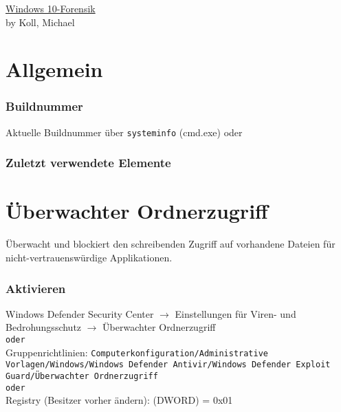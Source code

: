 \raggedright
\footnotesize
\begin{multicols}{3}	
	\setlength{\premulticols}{1pt}
	\setlength{\postmulticols}{1pt}
	\setlength{\multicolsep}{1pt}
	\setlength{\columnsep}{2pt}

\begin{center}
     \Large{\underline{Windows 10-Forensik}} \\
     \small by Koll, Michael \\
\end{center}

\section{Allgemein}

\subsubsection{Buildnummer}
Aktuelle Buildnummer über \texttt{systeminfo} (cmd.exe) oder 

\subsubsection{Zuletzt verwendete Elemente}

\section{Überwachter Ordnerzugriff}
Überwacht und blockiert den schreibenden Zugriff auf vorhandene Dateien für nicht-vertrauenswürdige Applikationen.


\subsubsection{Aktivieren}
Windows Defender Security Center $\rightarrow$ Einstellungen für Viren- und Bedrohungsschutz $\rightarrow$ Überwachter Ordnerzugriff\\
\texttt{oder}\\
Gruppenrichtlinien: \texttt{Computerkonfiguration/Administrative Vorlagen/Windows/Windows Defender Antivir/Windows Defender Exploit Guard/Überwachter Ordnerzugriff}\\
\texttt{oder}\\
Registry (Besitzer vorher ändern):  (DWORD) = 0x01


\end{multicols}
